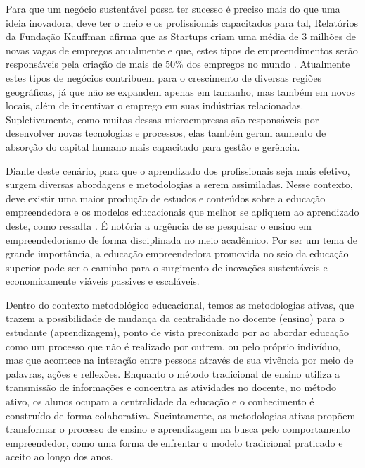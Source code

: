 Para que um negócio sustentável possa ter sucesso é preciso mais do que uma ideia inovadora, deve ter o meio e os profissionais capacitados para tal, Relatórios da Fundação Kauffman afirma que as Startups criam uma média de 3 milhões de novas vagas de empregos anualmente e que, estes tipos de empreendimentos serão responsáveis pela criação de mais de 50\% dos empregos no  mundo  \cite{brasil_o_2017}. Atualmente estes tipos de  negócios contribuem para o crescimento de diversas regiões geográficas, já que não se expandem apenas em tamanho, mas também em novos locais, além de incentivar o emprego em suas indústrias relacionadas. Supletivamente, como muitas dessas microempresas são responsáveis por desenvolver novas tecnologias e processos, elas também geram aumento de absorção do capital humano mais capacitado para gestão e gerência.


Diante deste cenário, para que o aprendizado dos profissionais seja mais efetivo, surgem diversas abordagens e metodologias a serem assimiladas. Nesse contexto, deve existir uma maior produção de estudos e conteúdos sobre a educação empreendedora e os modelos educacionais que melhor se apliquem ao aprendizado deste, como ressalta . É notória a urgência de se pesquisar o ensino em empreendedorismo de forma disciplinada no meio acadêmico. Por ser um tema de grande importância, a educação empreendedora promovida no seio da educação superior pode ser o caminho para o surgimento de inovações sustentáveis e economicamente viáveis passives e escaláveis.


Dentro do contexto metodológico educacional, temos as metodologias ativas, que trazem a possibilidade de mudança da centralidade no docente (ensino) para o estudante (aprendizagem), ponto de vista preconizado por  ao abordar educação como um processo que não é realizado por outrem, ou pelo próprio indivíduo, mas que acontece na interação entre pessoas através de sua vivência por meio de palavras, ações e reflexões. Enquanto o método tradicional de ensino utiliza a transmissão de informações e concentra as atividades no docente, no método ativo, os alunos ocupam a centralidade da educação e o conhecimento é construído de forma colaborativa. Sucintamente, as metodologias ativas propõem transformar o processo de ensino e aprendizagem na busca pelo comportamento empreendedor, como uma forma de enfrentar o modelo tradicional praticado e aceito ao longo dos anos.
 

